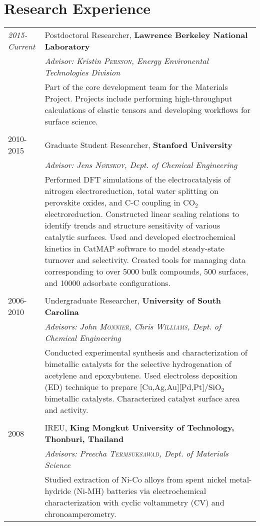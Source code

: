 \documentclass[a4paper,10pt]{article}
\begin{document}
\section{Research Experience}
\begin{tabular}{l|p{11cm}}
 \emph{2015-Current} & Postdoctoral Researcher, \textbf{Lawrence Berkeley National Laboratory} \\
 &\emph{Advisor: Kristin \textsc{Persson}, Energy Environental Technologies Division}\\&
 \footnotesize{Part of the core development team for the Materials Project.  Projects include performing 
 high-throughput calculations of elastic tensors and developing workflows for surface science.}\\\multicolumn{2}{c}{} \\
 \textsc{2010-2015} & Graduate Student Researcher, \textbf{Stanford University}\\&\emph{Advisor: Jens \textsc{N\o rskov}, Dept. of Chemical Engineering}\\&\footnotesize{Performed DFT simulations of the electrocatalysis of nitrogen electroreduction, total water splitting on perovskite oxides, and C-C coupling in CO$_2$ electroreduction.  Constructed linear scaling relations to identify trends and structure sensitivity of various catalytic surfaces.  Used and developed electrochemical kinetics in CatMAP software to model steady-state turnover and selectivity.  Created tools for managing data corresponding to over 5000 bulk compounds, 500 surfaces, and 10000 adsorbate configurations.}\\\multicolumn{2}{c}{} \\
\textsc{2006-2010} & Undergraduate Researcher, \textbf{University of South Carolina}\\&\emph{Advisors: John \textsc{Monnier}, Chris \textsc{Williams}, Dept. of Chemical Engineering}\\&\footnotesize{Conducted experimental synthesis and characterization of bimetallic catalysts for the selective hydrogenation of acetylene and epoxybutene.  Used electroless deposition (ED) technique to prepare [Cu,Ag,Au][Pd,Pt]/SiO$_2$ bimetallic catalysts.  Characterized catalyst surface area and activity.}\\ \multicolumn{2}{c}{} \\
\textsc{2008} & IREU, \textbf{King Mongkut University of Technology, Thonburi, Thailand}\\&\emph{Advisors: Preecha \textsc{Termsuksawad}, Dept. of Materials Science}\\&\footnotesize{Studied extraction of Ni-Co alloys from spent nickel metal-hydride (Ni-MH) batteries via electrochemical characterization with cyclic voltammetry (CV) and chronoamperometry.}
\end{tabular}
\vspace{0.2in}
\end{document}
